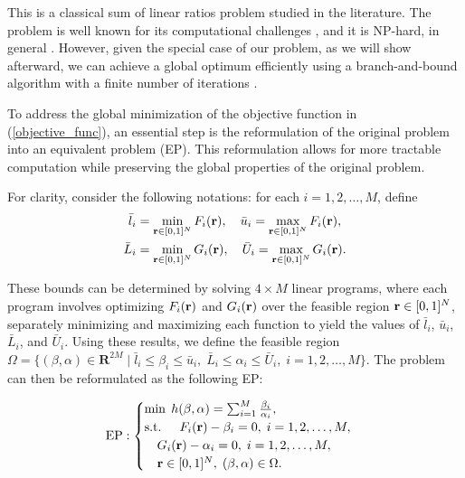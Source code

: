 This is a classical sum of linear ratios problem studied in the literature. The problem is well known for its computational challenges \cite{schaible2003fractional}, and it is NP-hard, in general \cite{freund2001solving}. However, given the special case of our problem, as we will show afterward, we can achieve a global optimum efficiently using a branch-and-bound algorithm with a finite number of iterations \cite{JIAO2022112701}.


To address the global minimization of the objective function in (\ref{objective_func}), an essential step is the reformulation of the original problem into an equivalent problem (EP). This reformulation allows for more tractable computation while preserving the global properties of the original problem.

For clarity, consider the following notations: for each \( i = 1, 2, \dots, M \), define
\[
\begin{aligned}
    \bar{l}_i &= \min_{\mathbf{r} \in [0,1]^{N}} F_i(\mathbf{r}), \quad 
    \bar{u}_i = \max_{\mathbf{r} \in [0,1]^{N}} F_i(\mathbf{r}), \\
    \bar{L}_i &= \min_{\mathbf{r} \in [0,1]^{N}} G_i(\mathbf{r}), \quad 
    \bar{U}_i = \max_{\mathbf{r} \in [0,1]^{N}} G_i(\mathbf{r}).
\end{aligned}
\]

These bounds can be determined by solving \( 4 \times M \) linear programs, where each program involves optimizing \( F_i(\mathbf{r}) \) and \( G_i(\mathbf{r}) \) over the feasible region \( \mathbf{r} \in [0,1]^{N} \), separately minimizing and maximizing each function to yield the values of \( \bar{l}_i \), \( \bar{u}_i \), \( \bar{L}_i \), and \( \bar{U}_i \). Using these results, we define the feasible region $
\Omega = \{ (\beta, \alpha) \in \mathbf{R}^{2M} \mid \bar{l}_i \leq \beta_i \leq \bar{u}_i, \; \bar{L}_i \leq \alpha_i \leq \bar{U}_i, \; i = 1, 2, \dots, M \}.
$
The problem can then be reformulated as the following EP:

\[
\text{EP}:
\begin{cases}
    \min \; h(\beta, \alpha) = \sum_{i=1}^M \frac{\beta_i}{\alpha_i}, \\
    \text{s.t. } \quad F_i(\mathbf{r}) - \beta_i = 0, \; i = 1, 2, \dots, M, \\
    \quad G_i(\mathbf{r}) - \alpha_i = 0, \; i = 1, 2, \dots, M, \\
    \quad \mathbf{r} \in [0,1]^N, \; (\beta, \alpha) \in \Omega.
\end{cases}
\]

